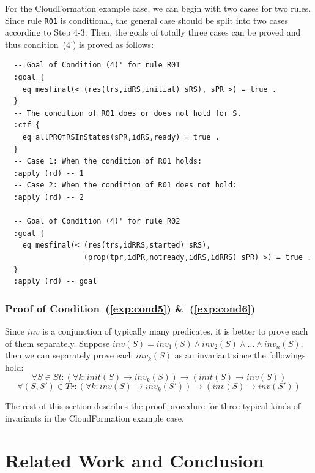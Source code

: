 \documentclass[12pt]{report}
\newcommand{\ra}{\rightarrow}
\begin{document}
For the CloudFormation example case, we can begin with two cases for
two rules. Since rule {\tt R01} is conditional, the general case
should be split into two cases according to Step 4-3. Then, the goals
of totally three cases can be proved and thus condition~(4') is proved
as follows:
\small
\begin{verbatim}
  -- Goal of Condition (4)' for rule R01
  :goal {
    eq mesfinal(< (res(trs,idRS,initial) sRS), sPR >) = true .
  }
  -- The condition of R01 does or does not hold for S.
  :ctf {
    eq allPROfRSInStates(sPR,idRS,ready) = true .
  }
  -- Case 1: When the condition of R01 holds:
  :apply (rd) -- 1
  -- Case 2: When the condition of R01 does not hold:
  :apply (rd) -- 2

  -- Goal of Condition (4)' for rule R02
  :goal {
    eq mesfinal(< (res(trs,idRRS,started) sRS),
                  (prop(tpr,idPR,notready,idRS,idRRS) sPR) >) = true .
  }
  :apply (rd) -- goal
\end{verbatim}
\normalsize

\subsection{Proof of Condition~(\ref{exp:cond5}) \&~(\ref{exp:cond6})}
\label{sec:TOSCAinvariant}
Since $inv$ is a conjunction of typically many predicates, it is
better to prove each of them separately. Suppose $inv(S) =
inv_1(S)\land inv_2(S)\land\dots\land inv_n(S)$, then we can
separately prove each $inv_k(S)$ as an invariant since the followings
hold:
\[\forall S\in St: (\forall k:init(S)\ra inv_k(S))\ra(init(S)\ra inv(S))\]
\[\forall (S,S')\in Tr: (\forall k:inv(S)\ra inv_k(S'))\ra(inv(S)\ra inv(S'))\]

\vspace{0.3cm}
The rest of this section describes the proof procedure for three
typical kinds of invariants in the CloudFormation example case.

\chapter{Related Work and Conclusion}
\label{chap:conclusion}
\end{document}
